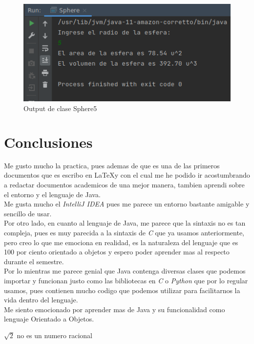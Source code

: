 \documentclass{article}
\begin{document}
 		\begin{figure}[H]
 			\centering
 			\includegraphics[scale = 0.8]{images/sphereout}
 			\caption{Output de clase Sphere5}
 		\end{figure}
 		\newpage
 	
 	\section{Conclusiones}
 	
 	Me gusto mucho la practica, pues ademas de que es una de las primeros documentos que es escribo en \LaTeX y con el cual me he podido ir acostumbrando a redactar documentos academicos de una mejor manera, tambien aprendi sobre el entorno y el lenguaje de Java.\\
 	
 	Me gusta mucho el \emph{IntelliJ IDEA} pues me parece un entorno bastante amigable y sencillo de usar.\\
 	
 	Por otro lado, en cuanto al lenguaje de Java, me parece que la sintaxis no es tan compleja, pues es muy parecida a la sintaxis de \emph{C} que ya usamos anteriormente, pero creo lo que me emociona en realidad, es la naturaleza del lenguaje que es 100 por ciento orientado a objetos y espero poder aprender mas al respecto durante el semestre.\\
 	
 	Por lo mientras me parece genial que Java contenga diversas clases que podemos importar y funcionan justo como las bibliotecas en \emph{C} o \emph{Python} que por lo regular usamos, pues contienen mucho codigo que podemos utilizar para facilitarnos la vida dentro del lenguaje.\\
 	
 	Me siento emocionado por aprender mas de Java y su funcionalidad como lenguaje Orientado a Objetos. 
 	
 	$\sqrt{2}$ no es un numero racional
 		
 		
 		
 		
 		
		
	
	
	 
			
	
	
	
	
	
	
	
\end{document}

